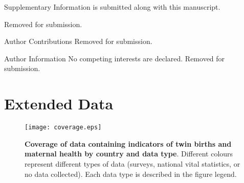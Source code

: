 \documentclass{nature}
\begin{document}
\begin{linenumbers}
\clearpage


\clearpage
\begin{addendum}
 \item[Supplementary Information] is submitted along with this manuscript.
 \item Removed for submission. %
 \item[Author Contributions] Removed for submission. %
 \item[Author Information] No competing interests are declared. Removed for submission. %
\end{addendum}

\clearpage
\setcounter{figure}{0}
\setcounter{table}{0}
\renewcommand{\tablename}{Extended Data Table}
\renewcommand{\thetable}{E\arabic{table}}
\renewcommand{\figurename}{Extended Data Figure}
\renewcommand{\thefigure}{E\arabic{figure}}
\section{Extended Data}
\begin{spacing}{1}

\begin{figure}[htpb!]
\texttt{[image: coverage.eps]}
\caption{\textbf{Coverage of data containing indicators of twin births and maternal health by country and data type}. {\footnotesize  Different colours represent different types of data (surveys, national vital statistics, or no data collected).  Each data type is described in the figure legend.}}
\label{fig:twincoverage}
\end{figure}


\end{spacing}
\end{linenumbers}
\end{document}
